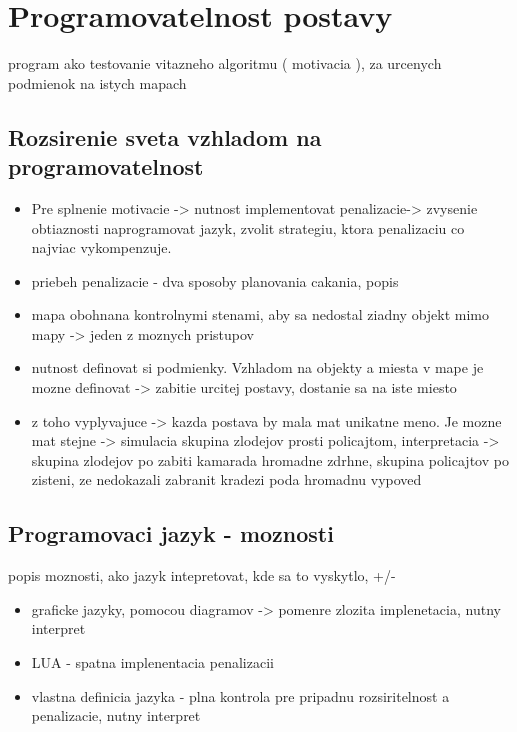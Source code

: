 \documentclass[a4paper,11pt,final]{report}
\begin{document}
\section{Programovatelnost postavy}
program ako testovanie vitazneho algoritmu ( motivacia ), za urcenych podmienok na istych mapach
\subsection{Rozsirenie sveta vzhladom na programovatelnost}
\begin{itemize}
\item Pre splnenie motivacie -> nutnost  implementovat penalizacie-> zvysenie obtiaznosti naprogramovat jazyk, zvolit strategiu, ktora penalizaciu co najviac vykompenzuje. 
\item priebeh penalizacie  - dva sposoby planovania cakania, popis
\item mapa obohnana kontrolnymi stenami, aby sa nedostal ziadny objekt mimo mapy -> jeden z moznych pristupov
\item nutnost definovat si podmienky. Vzhladom na objekty a miesta v mape je mozne definovat -> zabitie urcitej postavy, dostanie sa na iste miesto
\item z toho vyplyvajuce -> kazda postava by mala mat unikatne meno. Je mozne mat stejne -> simulacia skupina zlodejov prosti policajtom, interpretacia -> skupina zlodejov po zabiti kamarada hromadne zdrhne, skupina policajtov po zisteni, ze nedokazali zabranit kradezi poda hromadnu vypoved
\end{itemize}
\subsection{Programovaci jazyk - moznosti}
popis moznosti, ako jazyk intepretovat, kde sa to vyskytlo, +/-
\begin{itemize}
\item graficke jazyky, pomocou diagramov -> pomenre zlozita implenetacia, nutny interpret
\item LUA - spatna implenentacia penalizacii
\item vlastna definicia jazyka - plna kontrola pre pripadnu rozsiritelnost a penalizacie, nutny interpret
\end{itemize}
\end{document}
